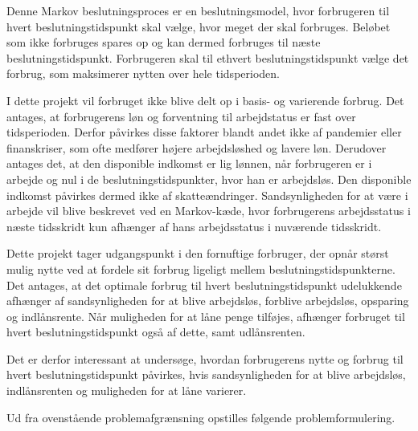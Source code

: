 Denne Markov beslutningsproces er en beslutningsmodel, hvor forbrugeren til hvert beslutningstidspunkt skal vælge, hvor meget der skal forbruges. Beløbet som ikke forbruges spares op og kan dermed forbruges til næste beslutningstidspunkt. Forbrugeren skal til ethvert beslutningstidspunkt vælge det forbrug, som maksimerer nytten over hele tidsperioden. %

I dette projekt vil forbruget ikke blive delt op i basis- og varierende forbrug. Det antages, at forbrugerens løn og forventning til arbejdstatus er fast over tidsperioden. Derfor påvirkes disse faktorer blandt andet ikke af pandemier eller finanskriser, som ofte medfører højere arbejdsløshed og lavere løn. Derudover antages det, at den disponible indkomst er lig lønnen, når forbrugeren er i arbejde og nul i de beslutningstidspunkter, hvor han er arbejdsløs. Den disponible indkomst påvirkes dermed ikke af skatteændringer. Sandsynligheden for at være i arbejde vil blive beskrevet ved en Markov-kæde, hvor forbrugerens arbejdsstatus i næste tidsskridt kun afhænger af hans arbejdsstatus i nuværende tidsskridt.

Dette projekt tager udgangspunkt i den fornuftige forbruger, der opnår størst mulig nytte ved at fordele sit forbrug ligeligt mellem beslutningstidspunkterne. Det antages, at det optimale forbrug til hvert beslutningstidspunkt udelukkende afhænger af sandsynligheden for at blive arbejdsløs, forblive arbejdsløs, opsparing og indlånsrente. Når muligheden for at låne penge tilføjes, afhænger forbruget til hvert beslutningstidspunkt også af dette, samt udlånsrenten.

Det er derfor interessant at undersøge, hvordan forbrugerens nytte og forbrug til hvert beslutningstidspunkt påvirkes, hvis sandsynligheden for at blive arbejdsløs, indlånsrenten og muligheden for at låne varierer. 




Ud fra ovenstående problemafgrænsning opstilles følgende problemformulering.





 



